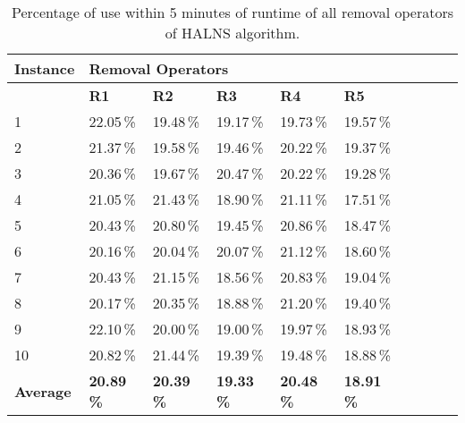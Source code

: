 \documentclass[thesis=M,english]{FITthesis}[2012/10/20]
\begin{document}
    \begin{table}[!ht]
    \centering
    {\renewcommand{\arraystretch}{1.5}
    \begin{tabular}{llllllllll}
    \hline
    \textbf{Instance} & \multicolumn{5}{l}{\textbf{Removal Operators}}                                                        \\ \hline
    \textbf{}         & \textbf{R1}       & \textbf{R2}        & \textbf{R3}        & \textbf{R4}        & \textbf{R5}        \\ \hline
    1                 & 22.05\,\%         & 19.48\,\%          & 19.17\,\%          & 19.73\,\%          & 19.57\,\%          \\
    2                 & 21.37\,\%         & 19.58\,\%          & 19.46\,\%          & 20.22\,\%          & 19.37\,\%          \\
    3                 & 20.36\,\%         & 19.67\,\%          & 20.47\,\%          & 20.22\,\%          & 19.28\,\%          \\
    4                 & 21.05\,\%         & 21.43\,\%          & 18.90\,\%          & 21.11\,\%          & 17.51\,\%          \\
    5                 & 20.43\,\%         & 20.80\,\%          & 19.45\,\%          & 20.86\,\%          & 18.47\,\%          \\
    6                 & 20.16\,\%         & 20.04\,\%          & 20.07\,\%          & 21.12\,\%          & 18.60\,\%          \\
    7                 & 20.43\,\%         & 21.15\,\%          & 18.56\,\%          & 20.83\,\%          & 19.04\,\%          \\
    8                 & 20.17\,\%         & 20.35\,\%          & 18.88\,\%          & 21.20\,\%          & 19.40\,\%          \\
    9                 & 22.10\,\%         & 20.00\,\%          & 19.00\,\%          & 19.97\,\%          & 18.93\,\%          \\
    10                & 20.82\,\%         & 21.44\,\%          & 19.39\,\%          & 19.48\,\%          & 18.88\,\%          \\ \hline
    \textbf{Average}  &\textbf{20.89\,\%} & \textbf{20.39\,\%} & \textbf{19.33\,\%} & \textbf{20.48\,\%} & \textbf{18.91\,\%}
    \end{tabular}}
    \caption{Percentage of use within 5 minutes of runtime of all removal operators of HALNS algorithm.}
    \label{tab:res-operator-percentage-removal}
    \end{table}
    
\end{document}
